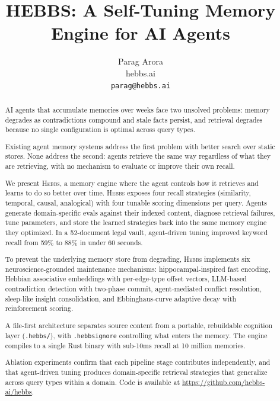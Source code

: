 \documentclass{article}
\title{HEBBS: A Self-Tuning Memory Engine for AI Agents}
\author{%
  Parag Arora \\
  hebbs.ai \\
  \texttt{parag@hebbs.ai} \\
}
\begin{document}
\maketitle

\begin{abstract}
AI agents that accumulate memories over weeks face two unsolved problems: memory degrades as contradictions compound and stale facts persist, and retrieval degrades because no single configuration is optimal across query types.

Existing agent memory systems address the first problem with better search over static stores. None address the second: agents retrieve the same way regardless of what they are retrieving, with no mechanism to evaluate or improve their own recall.

We present \textsc{Hebbs}, a memory engine where the agent controls how it retrieves and learns to do so better over time. \textsc{Hebbs} exposes four recall strategies (similarity, temporal, causal, analogical) with four tunable scoring dimensions per query. Agents generate domain-specific evals against their indexed content, diagnose retrieval failures, tune parameters, and store the learned strategies back into the same memory engine they optimized. In a 52-document legal vault, agent-driven tuning improved keyword recall from 59\% to 88\% in under 60 seconds.

To prevent the underlying memory store from degrading, \textsc{Hebbs} implements six neuroscience-grounded maintenance mechanisms: hippocampal-inspired fast encoding, Hebbian associative embeddings with per-edge-type offset vectors, LLM-based contradiction detection with two-phase commit, agent-mediated conflict resolution, sleep-like insight consolidation, and Ebbinghaus-curve adaptive decay with reinforcement scoring.

A file-first architecture separates source content from a portable, rebuildable cognition layer (\texttt{.hebbs/}), with \texttt{.hebbsignore} controlling what enters the memory. The engine compiles to a single Rust binary with sub-10ms recall at 10 million memories.

Ablation experiments confirm that each pipeline stage contributes independently, and that agent-driven tuning produces domain-specific retrieval strategies that generalize across query types within a domain.
Code is available at \url{https://github.com/hebbs-ai/hebbs}.
\end{abstract}

\end{document}
